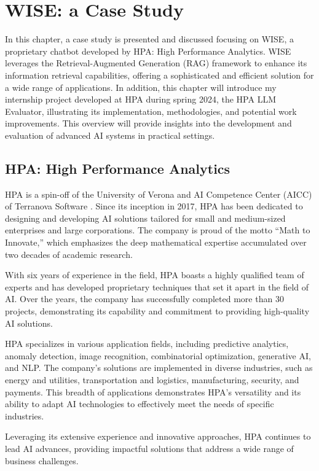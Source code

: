\section{WISE: a Case Study}

In this chapter, a case study is presented and discussed  focusing on WISE, a proprietary chatbot developed by HPA: High Performance Analytics. WISE leverages the Retrieval-Augmented Generation (RAG) framework to enhance its information retrieval capabilities, offering a sophisticated and efficient solution for a wide range of applications. In addition, this chapter will introduce my internship project developed at HPA during spring 2024, the HPA LLM Evaluator, illustrating its implementation, methodologies, and potential work improvements. This overview will provide insights into the development and evaluation of advanced AI systems in practical settings.

\subsection{HPA: High Performance Analytics}

HPA is a spin-off of the University of Verona and AI Competence Center (AICC) of Terranova Software \cite{terranova2024}. Since its inception in 2017, HPA has been dedicated to designing and developing AI solutions tailored for small and medium-sized enterprises and large corporations. The company is proud of the motto “Math to Innovate,” which emphasizes the deep mathematical expertise accumulated over two decades of academic research.

With six years of experience in the field, HPA boasts a highly qualified team of experts and has developed proprietary techniques that set it apart in the field of AI. Over the years, the company has successfully completed more than 30 projects, demonstrating its capability and commitment to providing high-quality AI solutions.

HPA specializes in various application fields, including predictive analytics, anomaly detection, image recognition, combinatorial optimization, generative AI, and NLP. The company's solutions are implemented in diverse industries, such as energy and utilities, transportation and logistics, manufacturing, security, and payments. This breadth of applications demonstrates HPA's versatility and its ability to adapt AI technologies to effectively meet the needs of specific industries.

Leveraging its extensive experience and innovative approaches, HPA continues to lead AI advances, providing impactful solutions that address a wide range of business challenges.

